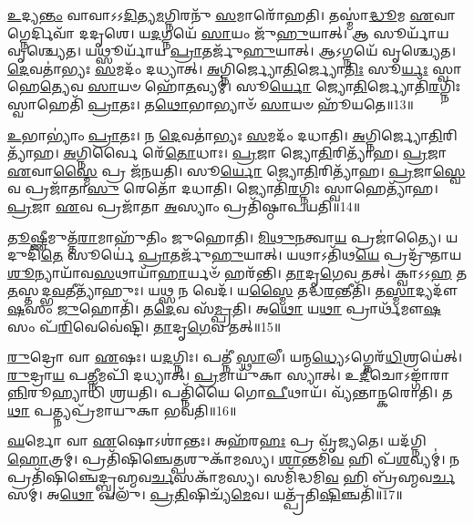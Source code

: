 \-\ul{𑌉}\-𑌦𑍍𑌯\-\ul{𑌨𑍍𑌤𑌂} 𑌵𑌾𑌵𑌾\-𑌽𑌽\-\ul{𑌦𑌿}\-𑌤𑍍𑌯\-\ul{𑌮}\-𑌗𑍍𑌨𑌿𑌰𑌨𑍁᳴ \ul{𑌸}\-𑌮𑌾𑌰𑍋᳴𑌹𑌤𑌿।
𑌤𑌸𑍍𑌮𑌾॑\-\ul{𑌦𑍍𑌧𑍂}\-𑌮 \ul{𑌏}\-𑌵𑌾𑌗𑍍𑌨𑍇𑌰𑍍𑌦𑌿𑌵𑌾᳴ 𑌦𑌦𑍃𑌶𑍇।
𑌯\-\ul{𑌦}\-𑌗𑍍𑌨𑌯𑍇᳴ \ul{𑌸𑌾}\-𑌯𑌂 𑌜𑍁᳴\-\ul{𑌹𑍁}\-𑌯𑌾𑌤𑍍।
𑌆 𑌸𑍂𑌰𑍍𑌯𑌾᳴𑌯 𑌵𑍃𑌶𑍍𑌚𑍍𑌯𑍇𑌤।
𑌯𑌥𑍍𑌸𑍂𑌰𑍍𑌯𑌾᳴𑌯 \ul{𑌪𑍍𑌰𑌾}\-𑌤𑌰𑍍𑌜𑍁᳴\-\ul{𑌹𑍁}\-𑌯𑌾𑌤𑍍।
𑌆𑌽𑌗𑍍𑌨𑌯𑍇᳴ 𑌵𑍃𑌶𑍍𑌚𑍍𑌯𑍇𑌤।
\-\ul{𑌦𑍇}\-𑌵𑌤𑌾॑𑌭𑍍𑌯𑌃 \ul{𑌸}\-𑌮𑌦𑌂᳴ 𑌦𑌧𑍍𑌯𑌾𑌤𑍍।
\-\ul{𑌅}\-𑌗𑍍𑌨𑌿𑌰𑍍𑌜𑍍𑌯𑍋\-\ul{𑌤𑌿}\-𑌰𑍍𑌜𑍍𑌯𑍋\-\ul{𑌤𑌿𑌃} 𑌸𑍂\-\ul{𑌰𑍍𑌯𑌃} 𑌸𑍍𑌵𑌾𑌹𑍇\-\ul{𑌤𑍍𑌯𑍇}\-𑌵 \ul{𑌸𑌾}\-𑌯𑍞 𑌹𑍋᳴\-\ul{𑌤}\-𑌵𑍍𑌯𑌮𑍍॑।
𑌸𑍂\-\ul{𑌰𑍍𑌯𑍋} 𑌜𑍍𑌯𑍋\-\ul{𑌤𑌿}\-𑌰𑍍𑌜𑍍𑌯𑍋𑌤𑌿᳴\-\ul{𑌰}\-𑌗𑍍𑌨𑌿𑌃 𑌸𑍍𑌵𑌾𑌹𑍇𑌤𑌿᳴ \ul{𑌪𑍍𑌰𑌾}\-𑌤𑌃।
𑌤\-\ul{𑌥𑍋}\-𑌭𑌾𑌭𑍍𑌯𑌾𑍞᳴ \ul{𑌸𑌾}\-𑌯𑍞 𑌹𑍂᳴𑌯𑌤𑍇॥13॥

\-\ul{𑌉}\-𑌭𑌾𑌭𑍍𑌯𑌾𑌂॑ \ul{𑌪𑍍𑌰𑌾}\-𑌤𑌃।
𑌨 \ul{𑌦𑍇}\-𑌵𑌤𑌾॑𑌭𑍍𑌯𑌃 \ul{𑌸}\-𑌮𑌦𑌂᳴ 𑌦𑌧𑌾𑌤𑌿।
\-\ul{𑌅}\-𑌗𑍍𑌨𑌿𑌰𑍍𑌜𑍍𑌯𑍋\-\ul{𑌤𑌿}\-\-𑌰𑌿𑌤𑍍𑌯𑌾᳴𑌹।
\-\ul{𑌅}\-𑌗𑍍𑌨𑌿𑌰𑍍𑌵𑍈 𑌰𑍇᳴\-\ul{𑌤𑍋}\-𑌧𑌾𑌃।
\-\ul{𑌪𑍍𑌰}\-𑌜𑌾 𑌜𑍍𑌯𑍋\-\ul{𑌤𑌿}\-𑌰𑌿𑌤𑍍𑌯𑌾᳴𑌹।
\-\ul{𑌪𑍍𑌰}\-𑌜𑌾 \ul{𑌏}\-𑌵𑌾\-\ul{𑌸𑍍𑌮𑍈} 𑌪𑍍𑌰 𑌜᳴𑌨𑌯𑌤𑌿।
𑌸𑍂\-\ul{𑌰𑍍𑌯𑍋} 𑌜𑍍𑌯𑍋\-\ul{𑌤𑌿}\-𑌰𑌿𑌤𑍍𑌯𑌾᳴𑌹।
\-\ul{𑌪𑍍𑌰}\-𑌜𑌾\-\ul{𑌸𑍍𑌵𑍇}\-𑌵 𑌪𑍍𑌰𑌜𑌾᳴𑌤𑌾\-\ul{𑌸𑍁} 𑌰𑍇𑌤𑍋᳴ 𑌦𑌧𑌾𑌤𑌿।
𑌜𑍍𑌯𑍋𑌤𑌿᳴\-\ul{𑌰}\-𑌗𑍍𑌨𑌿𑌃 𑌸𑍍𑌵𑌾𑌹𑍇𑌤𑍍𑌯𑌾᳴𑌹।
\-\ul{𑌪𑍍𑌰}\-𑌜𑌾 \ul{𑌏}\-𑌵 𑌪𑍍𑌰𑌜𑌾᳴𑌤𑌾 \ul{𑌅}\-𑌸𑍍𑌯𑌾𑌂 𑌪𑍍𑌰𑌤𑌿᳴\-𑌷𑍍𑌠𑌾𑌪𑌯𑌤𑌿॥14॥

\-\ul{𑌤𑍂}\-𑌷𑍍𑌣𑍀𑌮𑍁𑌤𑍍𑌤᳴\-\ul{𑌰𑌾}\-𑌮𑌾𑌹𑍁᳴𑌤𑌿𑌂 𑌜𑍁𑌹𑍋𑌤𑌿।
\-\ul{𑌮𑌿}\-\-\ul{𑌥𑍁}\-\-\ul{𑌨}\-𑌤𑍍𑌵𑌾\-\ul{𑌯} 𑌪𑍍𑌰𑌜𑌾॑𑌤𑍍𑌯𑍈।
𑌯𑌦𑍁𑌦𑌿᳴\-\ul{𑌤𑍇} 𑌸𑍂𑌰𑍍𑌯𑍇॑ \ul{𑌪𑍍𑌰𑌾}\-𑌤𑌰𑍍𑌜𑍁᳴\-\ul{𑌹𑍁}\-𑌯𑌾𑌤𑍍।
𑌯𑌥𑌾𑌽𑌤𑌿᳴𑌥\-\ul{𑌯𑍇} 𑌪𑍍𑌰𑌦𑍍𑌰𑍁᳴𑌤𑌾𑌯 \ul{𑌶𑍂}\-𑌨𑍍𑌯𑌾𑌯𑌾᳴𑌵\-\ul{𑌸}\-𑌥𑌾𑌯𑌾᳴\-\ul{𑌹𑌾}\-𑌰𑍍𑌯𑍞᳴ 𑌹𑌰᳴𑌨𑍍𑌤𑌿।
\-\ul{𑌤𑌾}\-𑌦𑍃\-\ul{𑌗𑍇}\-𑌵 𑌤𑌤𑍍।
𑌕𑍍𑌵𑌾𑌽𑌽\-\ul{𑌹} 𑌤\-\ul{𑌤}\-𑌸𑍍𑌤𑌦𑍍𑌭\-\ul{𑌵}\-𑌤𑍀𑌤𑍍𑌯𑌾᳴𑌹𑍁𑌃।
𑌯𑌥𑍍𑌸 𑌨 𑌵𑍇𑌦᳴।
𑌯\-\ul{𑌸𑍍𑌮𑍈} 𑌤𑌦𑍍𑌧\-\ul{𑌰}\-𑌨𑍍𑌤𑍀𑌤𑌿᳴।
𑌤\-\ul{𑌸𑍍𑌮𑌾}\-𑌦𑍍𑌯𑌦𑍗᳴\-\ul{𑌷}\-𑌸𑌂 \ul{𑌜𑍁}\-𑌹𑍋𑌤𑌿᳴।
𑌤\-\ul{𑌦𑍇}\-𑌵 𑌸᳴\-\ul{𑌮𑍍𑌪𑍍𑌰}\-𑌤𑌿।
𑌅\-\ul{𑌥𑍋} 𑌯\-\ul{𑌥𑌾} 𑌪𑍍𑌰𑌾𑌰𑍍𑌥᳴𑌮𑍗\-\ul{𑌷}\-𑌸𑌂 𑌪᳴\-\ul{𑌰𑌿}\-𑌵𑍇𑌵𑍇॑𑌷𑍍𑌟𑌿।
\-\ul{𑌤𑌾}\-𑌦𑍃\-\ul{𑌗𑍇}\-𑌵 𑌤𑌤𑍍॥15॥\anuvakamend[\-\ul{𑌅}\-\-\ul{𑌮𑍃}\-\-\ul{𑌷𑍍𑌟} \ul{𑌵𑌿}\-\-\ul{𑌚𑌿}\-𑌕𑌿𑌥𑍍𑌸᳴\-\ul{𑌤𑌿} 𑌜𑍁𑌹𑍍𑌵᳴\-\ul{𑌤𑍍𑌯}\-𑌜𑌾𑌮᳴\-𑌸𑍃𑌜𑌤𑌾𑌗𑍍𑌨𑌿\-\ul{𑌹𑍋}\-𑌤𑍍𑌰𑍞 𑌸𑍂𑌰𑍍𑌯𑌾᳴𑌯 \ul{𑌪𑍍𑌰𑌾}\-𑌤\-\ul{𑌰𑍍𑌜𑍁}\-𑌹𑍋\-\ul{𑌤𑌿} 𑌜𑍁𑌹𑍍𑌵᳴𑌤𑌿 \ul{𑌸}\-𑌮𑍍𑌪𑌦𑍍𑌯𑍇᳴𑌤𑍇 𑌹𑍂𑌯𑌤𑍇 𑌸𑍍𑌥𑌾𑌪𑌯𑌤𑌿 𑌸\-\ul{𑌮𑍍𑌪𑍍𑌰}\-𑌤𑌿 𑌦𑍍𑌵𑍇 𑌚᳴]

\-\ul{𑌰𑍁}\-𑌦𑍍𑌰𑍋 𑌵𑌾 \ul{𑌏}\-𑌷𑌃।
𑌯\-\ul{𑌦}\-𑌗𑍍𑌨𑌿𑌃।
𑌪𑌤𑍍𑌨𑍀॑ \ul{𑌸𑍍𑌥𑌾}\-𑌲𑍀।
𑌯𑌨𑍍𑌮\-\ul{𑌧𑍍𑌯𑍇}\-\-𑌽𑌗𑍍𑌨𑍇𑌰᳴\-\ul{𑌧𑌿}\-𑌶𑍍𑌰𑌯𑍇॑𑌤𑍍।
\-\ul{𑌰𑍁}\-𑌦𑍍𑌰𑌾\-\ul{𑌯} 𑌪\-\ul{𑌤𑍍𑌨𑍀}\-𑌮𑌪𑌿᳴ 𑌦𑌧𑍍𑌯𑌾𑌤𑍍।
\-\ul{𑌪𑍍𑌰}\-𑌮𑌾𑌯𑍁᳴𑌕𑌾 𑌸𑍍𑌯𑌾𑌤𑍍।
𑌉\-\ul{𑌦𑍀}\-𑌚𑍋\-𑌽𑌙𑍍𑌗𑌾᳴𑌰𑌾\-\ul{𑌨𑍍𑌨𑌿}\-𑌰𑍂𑌹𑍍𑌯𑌾𑌧𑌿᳴ 𑌶𑍍𑌰𑌯𑌤𑌿।
𑌪𑌤𑍍𑌨𑌿᳴𑌯𑍈 𑌗𑍋\-\ul{𑌪𑍀}\-𑌥𑌾𑌯᳴।
𑌵𑍍𑌯᳴𑌨𑍍𑌤𑌾𑌨𑍍𑌕𑌰𑍋𑌤𑌿।
𑌤\-\ul{𑌥𑌾} 𑌪𑌤𑍍𑌨𑍍𑌯𑌪𑍍𑌰᳴𑌮𑌾𑌯𑍁𑌕𑌾 𑌭𑌵𑌤𑌿॥16॥

\-\ul{𑌘}\-𑌰𑍍𑌮𑍋 𑌵𑌾 \ul{𑌏}\-𑌷𑍋\-𑌽𑌶𑌾॑𑌨𑍍𑌤𑌃।
𑌅𑌹᳴𑌰\-\ul{𑌹𑌃} 𑌪𑍍𑌰 𑌵𑍃᳴𑌜𑍍𑌯𑌤𑍇।
𑌯𑌦᳴𑌗𑍍𑌨𑌿\-\ul{𑌹𑍋}\-𑌤𑍍𑌰𑌮𑍍।
𑌪𑍍𑌰𑌤𑌿᳴\-𑌷𑌿𑌞𑍍𑌚𑍇\-\ul{𑌤𑍍𑌪}\-𑌶𑍁𑌕𑌾᳴𑌮𑌸𑍍𑌯।
\-\ul{𑌶𑌾}\-𑌨𑍍𑌤𑌮𑌿᳴\-\ul{𑌵} 𑌹𑌿 𑌪᳴\-\ul{𑌶}\-𑌵𑍍𑌯𑌮𑍍॑।
𑌨 𑌪𑍍𑌰𑌤𑌿᳴\-𑌷𑌿𑌞𑍍𑌚𑍇𑌦𑍍𑌬𑍍𑌰𑌹𑍍𑌮𑌵\-\ul{𑌰𑍍𑌚}\-𑌸𑌕𑌾᳴𑌮𑌸𑍍𑌯।
𑌸𑌮𑌿᳴𑌦𑍍𑌧𑌮𑌿\-\ul{𑌵} 𑌹𑌿 𑌬𑍍𑌰᳴𑌹𑍍𑌮𑌵\-\ul{𑌰𑍍𑌚}\-𑌸𑌮𑍍।
𑌅\-\ul{𑌥𑍋} 𑌖𑌲𑍁᳴।
\-\ul{𑌪𑍍𑌰}\-\-\ul{𑌤𑌿}\-𑌷𑌿𑌚𑍍𑌯᳴\-\ul{𑌮𑍇}\-𑌵।
𑌯𑌤𑍍𑌪𑍍𑌰᳴𑌤𑌿\-\ul{𑌷𑌿}\-𑌞𑍍𑌚𑌤𑌿᳴॥17॥

